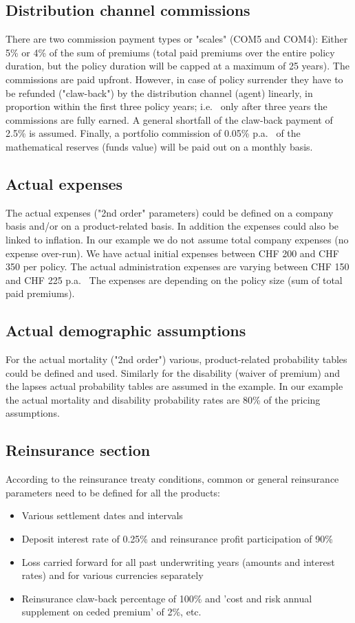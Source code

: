 \subsection{Distribution channel commissions}
There are two commission payment types or "scales" (COM5 and COM4): Either 5\% or 4\% of the sum of premiums (total paid premiums over the entire policy duration, but the policy duration will be capped at a maximum of 25 years). The commissions are paid upfront. However, in case of policy surrender they have to be refunded ("claw-back") by the distribution channel (agent) linearly, in proportion within the first three policy years; i.e.~ only after three years the commissions are fully earned. A general shortfall of the claw-back payment of 2.5\% is assumed.
Finally, a portfolio commission of 0.05\% p.a.~ of the mathematical reserves (funds value) will be paid out on a monthly basis.

\subsection{Actual expenses}
The actual expenses ("2nd order" parameters) could be defined on a company basis and/or on a product-related basis. In addition the expenses could also be linked to inflation. In our example we do not assume total company expenses (no expense over-run). We have actual initial expenses between CHF 200 and CHF 350 per policy. The actual administration expenses are varying between CHF 150 and CHF 225 p.a.~ The expenses are depending on the policy size (sum of total paid premiums).

\subsection{Actual demographic assumptions}
For the actual mortality ("2nd order") various, product-related probability tables could be defined and used. Similarly for the disability (waiver of premium) and the lapses actual probability tables are assumed in the example. In our example the actual mortality and disability probability rates are 80\% of the pricing assumptions.

\subsection{Reinsurance section}
According to the reinsurance treaty conditions, common or general reinsurance parameters need to be defined for all the products:
\begin{itemize}
	\item Various settlement dates and intervals
	\item Deposit interest rate of 0.25\% and reinsurance profit participation of 90\%
	\item Loss carried forward for all past underwriting years (amounts and interest rates) and for various currencies separately
	\item Reinsurance claw-back percentage of 100\% and 'cost and risk annual supplement on ceded premium' of 2\%, etc.
\end{itemize}


